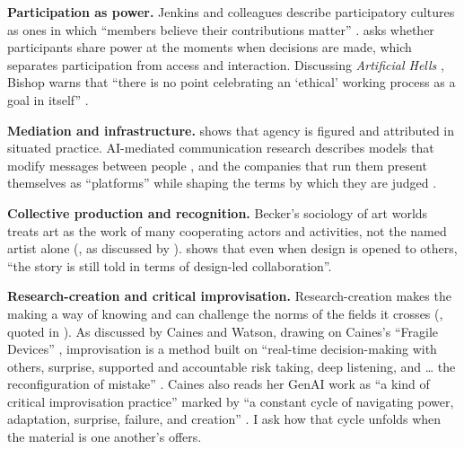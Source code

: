 \textbf{Participation as power.} Jenkins and colleagues describe
participatory cultures as ones in which ``members believe their
contributions matter'' \citep[3]{jenkins2006}. \citet{carpentier2016} asks whether participants
share power at the moments when decisions are made, which separates
participation from access and interaction. Discussing
\emph{Artificial Hells} \citep{bishop2012}, Bishop warns that ``there is no
point celebrating an `ethical' working process as a goal in itself''
\citep[176]{eschenburg2014}.

\textbf{Mediation and infrastructure.} \citet{suchman2007} shows that agency
is figured and attributed in situated practice. AI-mediated communication research describes models that modify
messages between people \citep{hancock2020}, and the companies that run them
present themselves as ``platforms'' while shaping the terms by which they are
judged \citep{gillespie2010}.

\textbf{Collective production and recognition.} Becker's sociology of art
worlds treats art as the work of many cooperating actors and activities, not
the named artist alone (\citealp{becker1982}, as discussed by
\citealp[39--46]{parker2014}). \citet[32]{hodson2019} shows that even
when design is opened to others, ``the story is still told in terms of
design-led collaboration''.

\textbf{Research-creation and critical improvisation.} Research-creation
makes the making a way of knowing \citep{chapman2012} and can challenge the
norms of the fields it crosses (\citealp[37]{loveless2019}, quoted in
\citealp[255]{caines2023consultation}). As discussed by Caines and Watson, drawing on
Caines's ``Fragile Devices'' \citep{caines2021fragile}, improvisation is a
method built on ``real-time decision-making with others, surprise, supported
and accountable risk taking, deep listening, and \ldots{} the reconfiguration
of mistake'' \citep[273]{caines2023consultation}. Caines also reads her GenAI work as ``a kind of
critical improvisation practice'' marked by ``a constant cycle of navigating
power, adaptation, surprise, failure, and creation''
\citep[193]{caines2026steaming}. I ask how that cycle unfolds when the
material is one another's offers.
